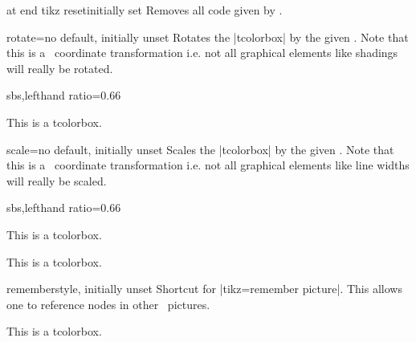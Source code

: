 \begin{docTcbKey}{at end tikz reset}{}{initially set}
  Removes all code given by .
\end{docTcbKey}


\clearpage
\begin{docTcbKey}{rotate}{=}{no default, initially unset}
  Rotates the |tcolorbox| by the given . Note that this is
  a \tikzname\  coordinate transformation i.e. not all graphical elements like shadings
  will really be rotated.
\begin{dispExample*}{sbs,lefthand ratio=0.66}

\begin{tcolorbox}[title=Rotated box,rotate=30]
This is a tcolorbox.
\end{tcolorbox}
\end{dispExample*}
\end{docTcbKey}

\begin{docTcbKey}{scale}{=}{no default, initially unset}
  Scales the |tcolorbox| by the given . Note that this is
  a \tikzname\  coordinate transformation i.e. not all graphical elements like line widths
  will really be scaled.
\begin{dispExample*}{sbs,lefthand ratio=0.66}

\begin{tcolorbox}[title=Scaled box,scale=0.5]
This is a tcolorbox.
\end{tcolorbox}
\begin{tcolorbox}[title=Scaled box,scale=1.25]
This is a tcolorbox.
\end{tcolorbox}
\end{dispExample*}
\end{docTcbKey}


\begin{docTcbKey}{remember}{}{style, initially unset}
  Shortcut for |tikz={remember picture}|. This allows one to reference nodes
  in other \tikzname\  pictures.
\begin{dispExample}
\begin{tcolorbox}[enhanced,remember,colback=red!5!white,colframe=red!75!black,
  fonttitle=\bfseries,title=The four corners of a paper,
  overlay={\draw[red!50!white,line width=1mm,opacity=0.5,shorten >=3mm]
    (frame.north west) edge[->] (current page.north west)
    (frame.north east) edge[->] (current page.north east)
    (frame.south west) edge[->] (current page.south west)
    (frame.south east) edge[->] (current page.south east);}]
This is a tcolorbox.
\end{tcolorbox}
\end{dispExample}
\end{docTcbKey}

